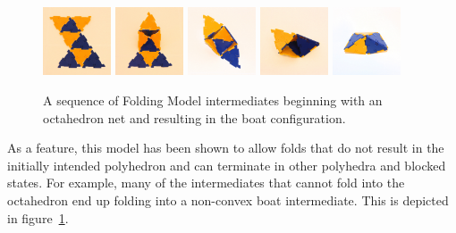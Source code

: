 \begin{figure}[h]

       \centering

                \includegraphics[width=0.18\textwidth]{images/folds_0.eps}
                \includegraphics[width=0.18\textwidth]{images/folds_1.eps}
                \includegraphics[width=0.18\textwidth]{images/folds_2.eps}
                \includegraphics[width=0.18\textwidth]{images/folds_3B.eps}
                \includegraphics[width=0.18\textwidth]{images/folds_4B.eps}


\caption{A sequence of Folding Model intermediates beginning with an octahedron net and resulting in the boat configuration.}
\label{fig:fold_boat}
\end{figure}

As a feature, this model has been shown to allow folds that do not result in the initially intended polyhedron and can terminate in other polyhedra and blocked states. For example, many of the intermediates that cannot fold into the octahedron end up folding into a non-convex boat intermediate. This is depicted in figure~\ref{fig:fold_boat}.

